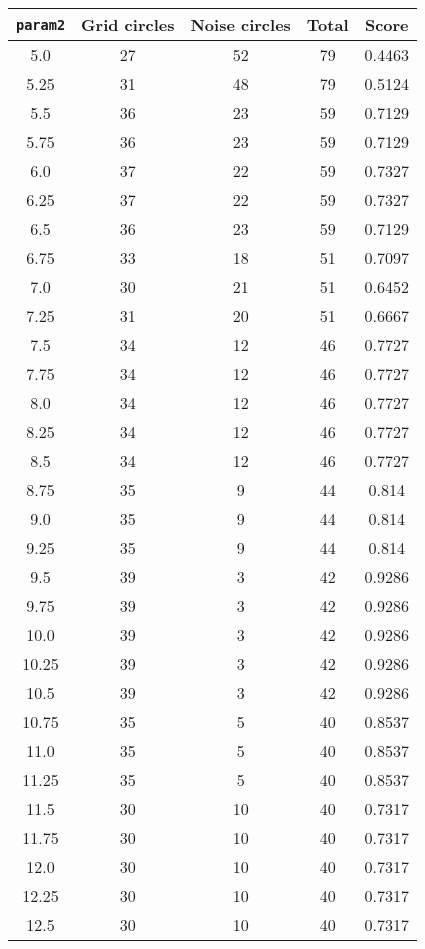 \documentclass[letterpaper, 12pt]{article}
\begin{document}
\begin{longtable}{|c|c|c|c|c|}
\hline
\textbf{\texttt{param2}} & \textbf{Grid circles} & \textbf{Noise circles} & \textbf{Total} & \textbf{Score} \\
\hline
5.0 & 27 & 52 & 79 & 0.4463 \\
\hline
5.25 & 31 & 48 & 79 & 0.5124 \\
\hline
5.5 & 36 & 23 & 59 & 0.7129 \\
\hline
5.75 & 36 & 23 & 59 & 0.7129 \\
\hline
6.0 & 37 & 22 & 59 & 0.7327 \\
\hline
6.25 & 37 & 22 & 59 & 0.7327 \\
\hline
6.5 & 36 & 23 & 59 & 0.7129 \\
\hline
6.75 & 33 & 18 & 51 & 0.7097 \\
\hline
7.0 & 30 & 21 & 51 & 0.6452 \\
\hline
7.25 & 31 & 20 & 51 & 0.6667 \\
\hline
7.5 & 34 & 12 & 46 & 0.7727 \\
\hline
7.75 & 34 & 12 & 46 & 0.7727 \\
\hline
8.0 & 34 & 12 & 46 & 0.7727 \\
\hline
8.25 & 34 & 12 & 46 & 0.7727 \\
\hline
8.5 & 34 & 12 & 46 & 0.7727 \\
\hline
8.75 & 35 & 9 & 44 & 0.814 \\
\hline
9.0 & 35 & 9 & 44 & 0.814 \\
\hline
9.25 & 35 & 9 & 44 & 0.814 \\
\hline
9.5 & 39 & 3 & 42 & 0.9286 \\
\hline
9.75 & 39 & 3 & 42 & 0.9286 \\
\hline
10.0 & 39 & 3 & 42 & 0.9286 \\
\hline
10.25 & 39 & 3 & 42 & 0.9286 \\
\hline
10.5 & 39 & 3 & 42 & 0.9286 \\
\hline
10.75 & 35 & 5 & 40 & 0.8537 \\
\hline
11.0 & 35 & 5 & 40 & 0.8537 \\
\hline
11.25 & 35 & 5 & 40 & 0.8537 \\
\hline
11.5 & 30 & 10 & 40 & 0.7317 \\
\hline
11.75 & 30 & 10 & 40 & 0.7317 \\
\hline
12.0 & 30 & 10 & 40 & 0.7317 \\
\hline
12.25 & 30 & 10 & 40 & 0.7317 \\
\hline
12.5 & 30 & 10 & 40 & 0.7317 \\

\end{longtable}
\end{document}
